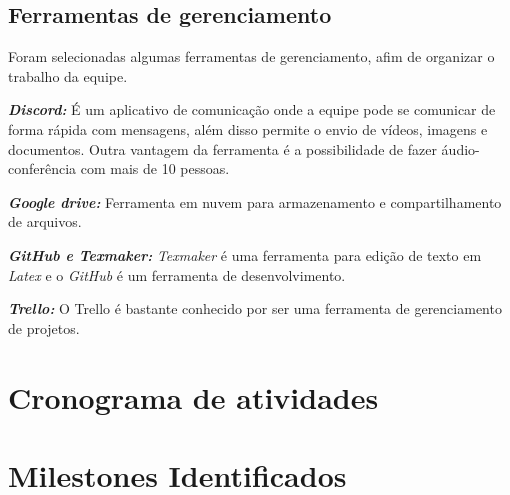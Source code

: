 \subsection{Ferramentas de gerenciamento}

Foram selecionadas algumas ferramentas de gerenciamento, afim de organizar o trabalho da equipe.

\emph{\textbf{Discord:}} É um aplicativo de comunicação onde a equipe pode se comunicar de forma rápida com mensagens, além disso permite o envio de vídeos, imagens e documentos. Outra vantagem da ferramenta é a possibilidade de fazer áudio-conferência com mais de 10 pessoas.

\emph{\textbf{Google drive:}} Ferramenta em nuvem para armazenamento e compartilhamento de arquivos.

\emph{\textbf{GitHub e Texmaker:}} \emph{Texmaker} é uma ferramenta para edição de texto em \emph{Latex} e o \emph{GitHub} é um ferramenta de desenvolvimento.

\emph{\textbf{Trello:}} O Trello é bastante conhecido por ser uma ferramenta de gerenciamento de projetos. 

\section{Cronograma de atividades}
\section{Milestones Identificados}

